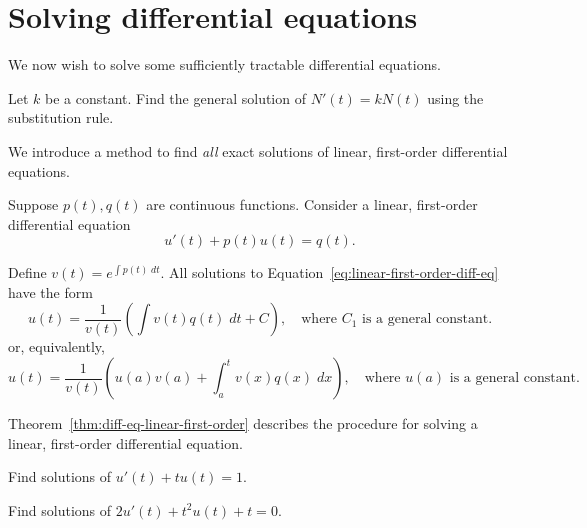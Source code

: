 \documentclass[../main.tex]{subfiles}
\begin{document}
 \section{Solving differential equations}

We now wish to solve some sufficiently tractable differential equations.

\begin{example}
  Let \(k\) be a constant. Find the general solution of \(N'(t) = kN(t)\) using the substitution rule.
\end{example}

We introduce a method to find \emph{all} exact solutions of linear, first-order differential equations.

\begin{thm} \label{thm:diff-eq-linear-first-order}
  Suppose \(p(t), q(t)\) are continuous functions. Consider a linear, first-order differential equation
  \begin{equation} \label{eq:linear-first-order-diff-eq}
    u'(t) + p(t) u(t) = q(t).
  \end{equation}
  
  Define \(v(t) = e^{\int p(t) \;dt}\). All solutions to Equation~\eqref{eq:linear-first-order-diff-eq} have the form
  \[
    u(t) = \frac{1}{v(t)} \left( \int v(t) q(t) \;dt + C \right), \quad\text{where \(C_{1}\) is a general constant}.
  \]
  or, equivalently,
  \[
    u(t) = \frac{1}{v(t)} \left( u(a)v(a) + \int_{a}^{t} v(x) q(x) \;dx \right), \quad\text{where \(u(a)\) is a general constant}.
  \]
\end{thm}

Theorem~\ref{thm:diff-eq-linear-first-order} describes the procedure for solving a linear, first-order differential equation. 
\begin{example}
  Find solutions of \(u'(t) + t u(t) = 1\).
\end{example}

\begin{example}
  Find solutions of \(2u'(t) + t^{2} u(t) + t = 0\).
\end{example}
\end{document}
